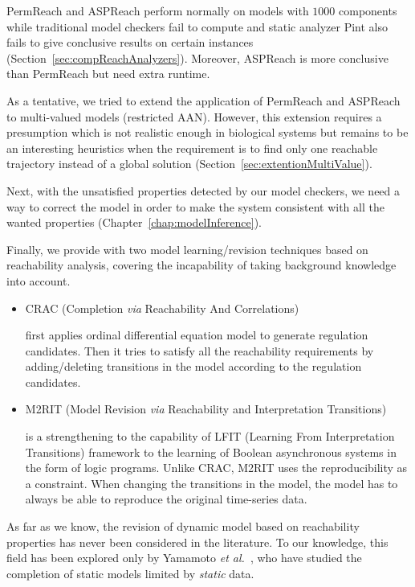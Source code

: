 PermReach and ASPReach perform normally on models with $1000$ components while traditional model checkers fail to compute and static analyzer Pint also fails to give conclusive results on certain instances (Section~\ref{sec:compReachAnalyzers}).
Moreover, ASPReach is more conclusive than PermReach but need extra runtime.

As a tentative, we tried to extend the application of PermReach and ASPReach to multi-valued models (restricted AAN).
However, this extension requires a presumption which is not realistic enough in biological systems but remains to be an interesting heuristics when the requirement is to find only one reachable trajectory instead of a global solution (Section~\ref{sec:extentionMultiValue}).

Next, with the unsatisfied properties detected by our model checkers, we need a way to correct the model in order to make the system consistent with all the wanted properties (Chapter~\ref{chap:modelInference}).

Finally, we provide with two model learning/revision techniques based on reachability analysis, covering the incapability of taking background knowledge into account.

\begin{itemize}
    \item CRAC (Completion \textit{via} Reachability And Correlations)
    
    first applies ordinal differential equation model to generate regulation candidates.
    Then it tries to satisfy all the reachability requirements by adding/deleting transitions in the model according to the regulation candidates.
    
    \item M2RIT (Model Revision \textit{via} Reachability and Interpretation Transitions)
    
    is a strengthening to the capability of LFIT (Learning From Interpretation Transitions) framework to the learning of Boolean asynchronous systems in the form of logic programs.
    Unlike CRAC, M2RIT uses the reproducibility as a constraint.
    When changing the transitions in the model, the model has to always be able to reproduce the original time-series data.
\end{itemize}

As far as we know, the revision of dynamic model based on reachability properties has never been considered in the literature.
To our knowledge, this field has been explored only by Yamamoto \textit{et al.}~\cite{yamamoto2014completing}, who have studied the completion of static models limited by \textit{static} data.

